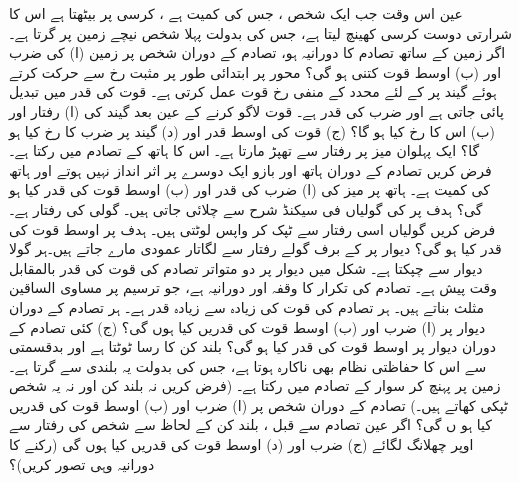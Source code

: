 عین  اس وقت جب ایک شخص ، جس کی کمیت  ہے  ، کرسی پر بیٹھتا  ہے اس کا شرارتی دوست کرسی کھینچ لیتا ہے، جس کی بدولت  پہلا شخص  نیچے   زمین پر گرتا ہے۔ اگر زمین کے ساتھ تصادم کا دورانیہ    ہو، تصادم کے دوران شخص پر زمین    (ا)  کی ضرب  اور (ب) اوسط قوت کتنی ہو گی؟
محور   پر ابتدائی طور پر  مثبت رخ    سے حرکت کرتے ہوئے  گیند پر  کے لئے  محدد کے منفی رخ  قوت عمل کرتی ہے۔ قوت کی قدر میں  تبدیل پائی جاتی ہے اور  ضرب کی قدر  ہے۔ قوت لاگو کرنے کے عین  بعد گیند کی (ا)  رفتار اور (ب) اس کا  رخ کیا ہو گا؟ (ج) قوت کی اوسط قدر اور (د)  گیند پر  ضرب کا رخ کیا ہو گا؟
ایک پہلوان    میز پر    رفتار سے  تھپڑ  مارتا ہے۔ اس کا ہاتھ   کے تصادم میں رکتا  ہے۔ فرض کریں تصادم  کے دوران ہاتھ اور بازو  ایک دوسرے پر اثر انداز نہیں ہوتے  اور ہاتھ کی کمیت  ہے۔ ہاتھ پر  میز کی (ا) ضرب  کی قدر اور (ب) اوسط قوت کی قدر کیا ہو گی؟
 ہدف پر   کی    گولیاں فی سیکنڈ شرح سے  چلائی جاتی ہیں۔ گولی  کی رفتار  ہے۔فرض کریں گولیاں  اسی رفتار سے ٹپک کر واپس لوٹتی ہیں۔ ہدف پر   اوسط قوت   کی قدر کیا ہو گی؟
دیوار پر   کے برف گولے    رفتار سے لگاتار عمودی  مارے جاتے ہیں۔ہر گولا  دیوار  سے چپکتا ہے۔ شکل  میں دیوار پر  دو  متواتر تصادم  کی قوت  کی قدر  بالمقابل وقت  پیش ہے۔ تصادم کی  تکرار کا وقفہ   اور دورانیہ  ہے، جو ترسیم پر مساوی الساقین مثلث بناتے ہیں۔   ہر تصادم   کی قوت کی زیادہ سے زیادہ قدر   ہے۔ ہر تصادم کے دوران دیوار پر  (ا) ضرب اور (ب) اوسط قوت کی قدریں کیا ہوں گی؟ (ج)  کئی تصادم کے دوران دیوار پر اوسط قوت  کی قدر کیا ہو گی؟
بلند کن  کا رسا ٹوٹتا ہے اور بدقسمتی سے  اس کا حفاظتی نظام بھی ناکارہ ہوتا ہے، جس کی بدولت یہ  بلندی سے گرتا ہے۔زمین پر پہنچ کر  سوار   کے تصادم   میں رکتا ہے۔ (فرض کریں نہ بلند کن اور نہ یہ شخص ٹپکی کھاتے ہیں۔) تصادم کے دوران شخص پر  (ا) ضرب   اور (ب)  اوسط قوت کی قدریں کیا ہو ں گی؟ اگر  عین تصادم سے قبل ، بلند کن کے لحاظ سے شخص  کی رفتار سے   اوپر  چھلانگ  لگائے (ج) ضرب اور (د) اوسط قوت کی قدریں کیا ہوں گی (رکنے کا دورانیہ وہی تصور کریں)؟
